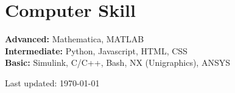\documentclass[letterpaper]{article}
\def\footerlink{}
\begin{document}
\section*{Computer Skill}

\textbf{Advanced:} Mathematica, MATLAB \\
\textbf{Intermediate:} Python, Javascript, HTML, CSS \\
\textbf{Basic:} Simulink, C/C++, Bash, NX (Unigraphics), ANSYS 

\begin{center}
  \begin{footnotesize}
  \vspace{20px}
    Last updated: \today \\
    \href{\footerlink}{\texttt{\footerlink}}
  \end{footnotesize}
\end{center}
\end{document}
